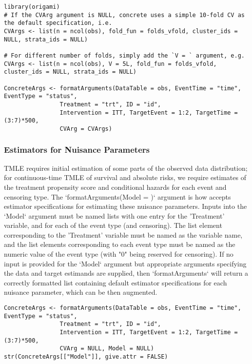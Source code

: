 \documentclass{report}
\newcommand{\1}{\ensuremath{\mathbf{1}}}
\begin{document}
\begin{lstlisting}
library(origami)
# If the CVArg argument is NULL, concrete uses a simple 10-fold CV as the default specification, i.e.
CVArgs <- list(n = ncol(obs), fold_fun = folds_vfold, cluster_ids = NULL, strata_ids = NULL)

# For different number of folds, simply add the `V = ` argument, e.g. 
CVArgs <- list(n = ncol(obs), V = 5L, fold_fun = folds_vfold, cluster_ids = NULL, strata_ids = NULL)

ConcreteArgs <- formatArguments(DataTable = obs, EventTime = "time", EventType = "status", 
				Treatment = "trt", ID = "id", 
				Intervention = ITT, TargetEvent = 1:2, TargetTime = (3:7)*500, 
				CVArg = CVArgs)
\end{lstlisting}

\subsubsection{Estimators for Nuisance Parameters}
TMLE requires initial estimation of some parts of the observed data distribution; for continuous-time TMLE of survival and absolute risks, we require estimates of the treatment propensity score and conditional hazards for each event and censoring type. The `formatArguments(Model = )` argument is how  accepts estimator specifications for estimating these nuisance parameters. Inputs into the `Model` argument must be named lists with one entry for the 'Treatment' variable, and for each of the event type (and censoring). The list element corresponding to the 'Treatment' variable must be named as the variable name, and the list elements corresponding to each event type must be named as the numeric value of the event type (with "0" being reserved for censoring). If no input is provided for the `Model` argument but appropriate arguments specifying the data and target estimands are supplied, then `formatArguments` will return a correctly formatted list containing default estimator specifications for each nuisance parameter, which can be then augmented.

\begin{lstlisting}
ConcreteArgs <- formatArguments(DataTable = obs, EventTime = "time", EventType = "status", 
				Treatment = "trt", ID = "id", 
				Intervention = ITT, TargetEvent = 1:2, TargetTime = (3:7)*500, 
				CVArg = NULL, Model = NULL)
str(ConcreteArgs[["Model"]], give.attr = FALSE)
\end{lstlisting}
\end{document}
